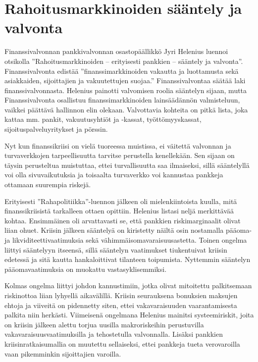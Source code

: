 \documentclass[12pt]{article}
\begin{document}
\newpage
\section{Rahoitusmarkkinoiden sääntely ja valvonta}

Finanssivalvonnan pankkivalvonnan osastopäällikkö Jyri Helenius luennoi otsikolla ''Rahoitusmarkkinoiden -- erityisesti pankkien -- sääntely ja valvonta''. Finanssivalvonta edistää ''finanssimarkkinoiden vakautta ja luottamusta sekä asiakkaiden, sijoittajien ja vakuutettujen suojaa.'' Finanssivalvontaa säätää laki finanssivalvonnasta. Helenius painotti valvomisen roolia sääntelyn sijaan, mutta Finanssivalvonta osallistuu finanssimarkkinoiden lainsäädännön valmisteluun, vaikkei päättävä hallinnon elin olekaan. Valvottavia kohteita on pitkä lista, joka kattaa mm. pankit, vakuutusyhtiöt ja -kassat, työttömyyskassat, sijoituspalveluyritykset ja pörssin.

Nyt kun finanssikriisi on vielä tuoreessa muistissa, ei väitettä valvonnan ja turvaverkkojen tarpeellisuutta tarvitse perustella kenellekään. Sen sijaan on täysin perusteltua muistuttaa, ettei turvallisuutta saa ilmaiseksi, sillä sääntelyllä voi olla sivuvaikutuksia ja toisaalta turvaverkko voi kannustaa pankkeja ottamaan suurempia riskejä.

Erityisesti ''Rahapolitiikka''-luennon jälkeen oli mielenkiintoista kuulla, mitä finanssikriisistä tarkalleen ottaen opittiin. Helenius listasi neljä merkittävää kohtaa. Ensimmäinen oli arvattavasti se, että pankkien riskimarginaalit olivat liian ohuet. Kriisin jälkeen sääntelyä on kiristetty näiltä osin nostamalla pääoma- ja likviditeettivaatimuksia sekä vähimmäisomavaraisuusastetta. Toinen ongelma liittyi sääntelyyn itseensä, sillä sääntelyn vaatimukset tiukentuivat kriisin edetessä ja sitä kautta hankaloittivat tilanteen toipumista. Nyttemmin sääntelyn pääomavaatimuksia on muokattu vastasyklisemmiksi.

Kolmas ongelma liittyi johdon kannustimiin, jotka olivat mitoitettu palkitsemaan riskinottoa liian lyhyellä aikavälillä. Kriisin seurauksena bonuksien maksujen ehtoja ja viiveitä on pidennetty siten, ettei vakavaraisuuden vaarantamisesta palkita niin herkästi. Viimeisenä ongelmana Helenius mainitsi systeemiriskit, joita on kriisin jälkeen alettu torjua uusilla makroriskeihin perustuvilla vakavaraisuusvaatimuksilla ja tehostetulla valvonnalla. Lisäksi pankkien kriisinratkaisumallia on muutettu sellaiseksi, ettei pankkeja tueta verovaroilla vaan pikemminkin sijoittajien varoilla.
\end{document}
